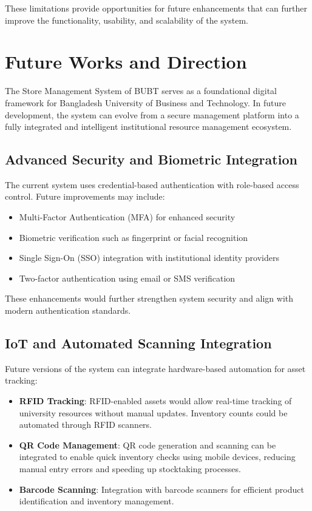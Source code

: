 These limitations provide opportunities for future enhancements that can further improve the functionality, usability, and scalability of the system.

\section{Future Works and Direction}

The Store Management System of BUBT serves as a foundational digital framework for Bangladesh University of Business and Technology. In future development, the system can evolve from a secure management platform into a fully integrated and intelligent institutional resource management ecosystem.

\subsection{Advanced Security and Biometric Integration}

The current system uses credential-based authentication with role-based access control. Future improvements may include:

\begin{itemize}
    \item Multi-Factor Authentication (MFA) for enhanced security
    \item Biometric verification such as fingerprint or facial recognition
    \item Single Sign-On (SSO) integration with institutional identity providers
    \item Two-factor authentication using email or SMS verification
\end{itemize}

These enhancements would further strengthen system security and align with modern authentication standards.

\subsection{IoT and Automated Scanning Integration}

Future versions of the system can integrate hardware-based automation for asset tracking:

\begin{itemize}
    \item \textbf{RFID Tracking}: RFID-enabled assets would allow real-time tracking of university resources without manual updates. Inventory counts could be automated through RFID scanners.

    \item \textbf{QR Code Management}: QR code generation and scanning can be integrated to enable quick inventory checks using mobile devices, reducing manual entry errors and speeding up stocktaking processes.

    \item \textbf{Barcode Scanning}: Integration with barcode scanners for efficient product identification and inventory management.
\end{itemize}

